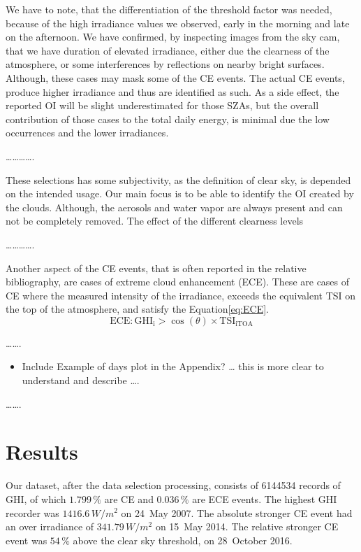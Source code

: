 \documentclass[
]{article}
\providecommand{\tightlist}{%
  \setlength{\itemsep}{0pt}\setlength{\parskip}{0pt}}
\begin{document}
We have to note, that the differentiation of the threshold factor was needed, because
of the high irradiance values we observed, early in the morning and late on the
afternoon. We have confirmed, by inspecting images from the sky cam, that we have
duration of elevated irradiance, either due the clearness of the atmosphere, or some
interferences by reflections on nearby bright surfaces. Although, these cases may
mask some of the CE events. The actual CE events, produce higher irradiance and thus
are identified as such. As a side effect, the reported OI will be slight
underestimated for those SZAs, but the overall contribution of those cases to the
total daily energy, is minimal due the low occurrences and the lower irradiances.

\ldots\ldots\ldots\ldots.

These selections has some subjectivity, as the definition of clear sky, is depended
on the intended usage. Our main focus is to be able to identify the OI created by the
clouds. Although, the aerosols and water vapor are always present and can not be
completely removed.
The effect of the different clearness levels

\ldots\ldots\ldots\ldots.

Another aspect of the CE events, that is often reported in the relative bibliography,
are cases of extreme cloud enhancement (ECE). These are cases of CE where the
measured intensity of the irradiance, exceeds the equivalent TSI on the top of the
atmosphere, and satisfy the Equation\nobreakspace{}\ref{eq:ECE}.
\begin{equation}
\text{ECE}: \text{GHI}_\text{i} > \cos(\theta) \times \text{TSI}_\text{iTOA}
\label{eq:ECE}
\end{equation}

\ldots\ldots.

\begin{itemize}
\tightlist
\item
  Include Example of days plot in the Appendix?
  \ldots{} this is more clear to understand and describe \ldots.
\end{itemize}

\ldots\ldots.

\FloatBarrier

\hypertarget{results}{%
\section{Results}\label{results}}

Our dataset, after the data selection processing, consists of
6144534 records of GHI, of which
\(1.799\,\%\) are CE and
\(0.036\,\%\) are ECE events.
The highest GHI recorder was
\(1416.6\,W/m^2\)
on 24~May 2007.
The absolute stronger CE event had an over irradiance of
\(341.79\,W/m^2\) on
15~May 2014.
The relative stronger CE event was
\(54\,\%\) above the
clear sky threshold, on
28~October 2016.
\end{document}
